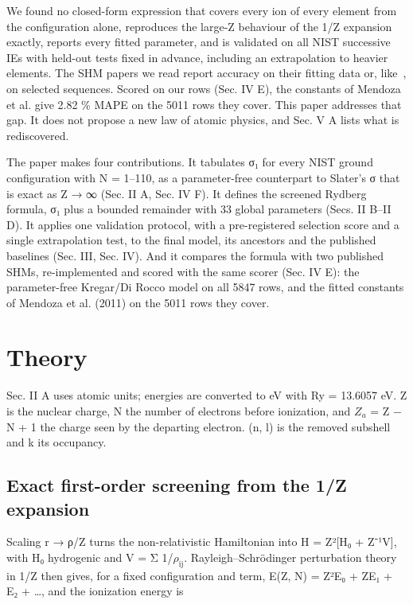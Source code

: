 \documentclass[aps,pra,preprint,notitlepage,superscriptaddress,amsmath,amssymb]{revtex4-2}
\begin{document}
We found no closed-form expression that covers every ion of every element from the configuration alone, reproduces the large-Z behaviour of the 1/Z expansion exactly, reports every fitted parameter, and is validated on all NIST successive IEs with held-out tests fixed in advance, including an extrapolation to heavier elements. The SHM papers we read report accuracy on their fitting data or, like~\cite{r19}, on selected sequences. Scored on our rows (Sec. IV E), the constants of Mendoza et al. give 2.82 \% MAPE on the 5011 rows they cover. This paper addresses that gap. It does not propose a new law of atomic physics, and Sec. V A lists what is rediscovered.


The paper makes four contributions. It tabulates σ₁ for every NIST ground configuration with N = 1–110, as a parameter-free counterpart to Slater's σ that is exact as Z → ∞ (Sec. II A, Sec. IV F). It defines the screened Rydberg formula, σ₁ plus a bounded remainder with 33 global parameters (Secs. II B–II D). It applies one validation protocol, with a pre-registered selection score and a single extrapolation test, to the final model, its ancestors and the published baselines (Sec. III, Sec. IV). And it compares the formula with two published SHMs, re-implemented and scored with the same scorer (Sec. IV E): the parameter-free Kregar/Di Rocco model on all 5847 rows, and the fitted constants of Mendoza et al. (2011) on the 5011 rows they cover.


\section{Theory}

Sec. II A uses atomic units; energies are converted to eV with Ry = 13.6057 eV. Z is the nuclear charge, N the number of electrons before ionization, and $Z_{a}$ = Z − N + 1 the charge seen by the departing electron. (n, l) is the removed subshell and k its occupancy.


\subsection{Exact first-order screening from the 1/Z expansion}

Scaling r → ρ/Z turns the non-relativistic Hamiltonian into H = Z²[H₀ + Z⁻¹V], with H₀ hydrogenic and V = Σ 1/$ρ_{\mathrm{ij}}$. Rayleigh–Schrödinger perturbation theory in 1/Z then gives, for a fixed configuration and term, E(Z, N) = Z²E₀ + ZE₁ + E₂ + …, and the ionization energy is
\end{document}
